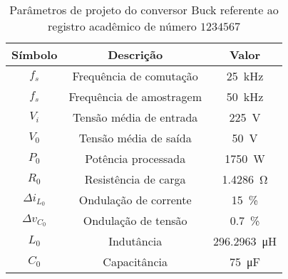 \begin{table}[!ht]
\centering
\caption{Parâmetros de projeto do conversor Buck referente ao registro acadêmico de número $1234567$}
\label{tab:parametros}
\begin{tabular}{@{}ccc@{}}
\toprule
\textbf{Símbolo} & \textbf{Descrição} & \textbf{Valor}\\ \midrule
$f_s$ & Frequência de comutação & \SI{25}{\kilo\hertz}\\
$f_s$ & Frequência de amostragem & \SI{50}{\kilo\hertz}\\
$V_i$ & Tensão média de entrada  & \SI{225}{\V}\\
$V_0$ & Tensão média de saída  & \SI{50}{\V} \\
$P_0$ & Potência processada  & \SI{1750}{\W} \\
$R_0$ & Resistência de carga & \SI{1.4286}{\ohm} \\
$\Delta{i_{L_0}}$  & Ondulação de corrente & \SI{15}{\%}\\
$\Delta{v_{C_0}}$  & Ondulação de tensão & \SI{0.7}{\%}\\
$L_0$ & Indutância & \SI{296.2963}{\micro\henry}\\
$C_0$ & Capacitância & \SI{75}{\micro\farad}\\
\bottomrule
\end{tabular}
\end{table}

